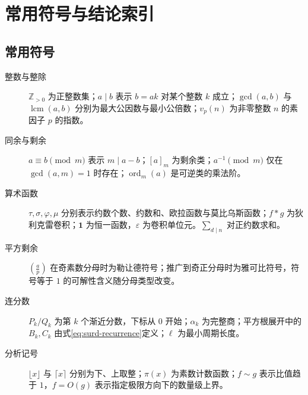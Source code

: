 \setcounter{chapter}{0} %
\chapter{常用符号与结论索引}
\label{app:reference}

\section{常用符号}
\begin{description}
 \item[整数与整除] $\mathbb Z_{>0}$ 为正整数集；$a\mid b$ 表示 $b=ak$ 对某个整数 $k$ 成立；$\gcd(a,b)$ 与 $\operatorname{lcm}(a,b)$ 分别为最大公因数与最小公倍数；$v_p(n)$ 为非零整数 $n$ 的素因子 $p$ 的指数。
 \item[同余与剩余] $a\equiv b\pmod m$ 表示 $m\mid a-b$；$[a]_m$ 为剩余类；$a^{-1}\pmod m$ 仅在 $\gcd(a,m)=1$ 时存在；$\operatorname{ord}_m(a)$ 是可逆类的乘法阶。
 \item[算术函数] $\tau,\sigma,\varphi,\mu$ 分别表示约数个数、约数和、欧拉函数与莫比乌斯函数；$f*g$ 为狄利克雷卷积；$\mathbf1$ 为恒一函数，$\varepsilon$ 为卷积单位元。$\sum_{d\mid n}$ 对正约数求和。
 \item[平方剩余] $\left(\frac ap\right)$ 在奇素数分母时为勒让德符号；推广到奇正分母时为雅可比符号，符号等于 $1$ 的可解性含义随分母类型改变。
 \item[连分数] $P_k/Q_k$ 为第 $k$ 个渐近分数，下标从 $0$ 开始；$\alpha_k$ 为完整商；平方根展开中的 $B_k,C_k$ 由式\eqref{eq:surd-recurrence}定义；$\ell$ 为最小周期长度。
 \item[分析记号] $\lfloor x\rfloor$ 与 $\lceil x\rceil$ 分别为下、上取整；$\pi(x)$ 为素数计数函数；$f\sim g$ 表示比值趋于 $1$，$f=O(g)$ 表示指定极限方向下的数量级上界。
\end{description}

